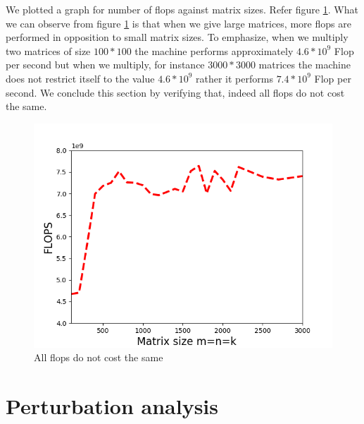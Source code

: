 \documentclass[10pts]{article}
\begin{document}
 We plotted a graph for number of flops against matrix sizes. Refer figure \ref{fig:benchmarkcurve}.  What we can observe from figure \ref{fig:benchmarkcurve} is that when we give large matrices, more flops are performed in opposition to small matrix sizes. To emphasize, when we multiply two matrices of size $100*100$
 the machine performs approximately $4.6*10^{9}$ Flop per second but when we multiply, for instance $3000*3000$ matrices the machine does not restrict itself to the value $4.6*10^{9}$ rather it performs $7.4*10^{9}$ Flop per second. We conclude this section by verifying that, indeed all flops do not cost the same.\\
  \begin{figure}[!]
 		\begin{center}
 	\includegraphics[scale =0.9]{benchmarkcurve.png}
 	\caption{All flops do not cost the same}
 	\label{fig:benchmarkcurve}
 	\end{center}
 \end{figure}


\section{Perturbation analysis}
\end{document}
